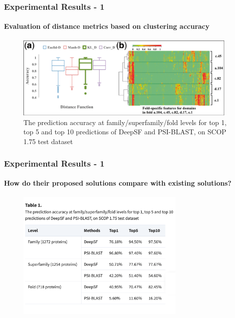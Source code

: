 \documentclass[xcolor={usenames,dvipsnames},hyperref={hyperindex,bookmarks}]{beamer}
\begin{document}
\frame
{
	\frametitle{Experimental Results - 1}
	\framesubtitle{Evaluation of distance metrics based on clustering accuracy}


	\begin{figure}[h]
	\centering 
	\includegraphics[height=1.6in]{./pics/distance-metrics}
	\caption{The prediction accuracy at family/superfamily/fold levels for top 1, top 5 and top 10 predictions of DeepSF and PSI-BLAST, on SCOP 1.75 test dataset}
	\label{fig:distancemetrics}
	\end{figure}
}








\frame
{
	\frametitle{Experimental Results - 1}
	\framesubtitle{How do their proposed solutions compare with existing solutions?}


	\begin{figure}[h]
	\centering 
	\includegraphics[height=2.5in]{./pics/table-1}
	\label{fig:Table1}
	\end{figure}
}
\end{document}
